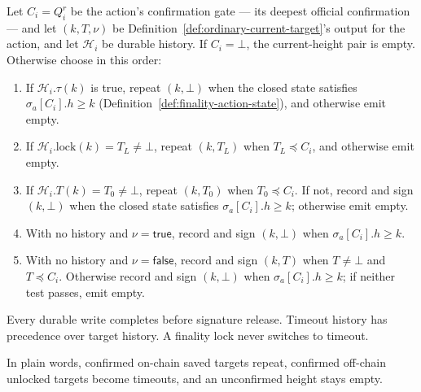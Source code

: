\begin{definition}\label{def:height-vote-rule}
Let \(C_i=Q_i^r\) be the action's confirmation gate --- its deepest
official confirmation --- and let
\((k,T,\nu)\) be Definition~\ref{def:ordinary-current-target}'s output for the
action, and let \(\mathcal H_i\) be durable history.  If
\(C_i=\bot\), the current-height pair is empty.  Otherwise choose in this
order:
\begin{enumerate}
 \item If \(\mathcal H_i.\tau(k)\) is true, repeat \((k,\bot)\) when the
   closed state satisfies \(\sigma_a[C_i].h\geq k\)
   (Definition~\ref{def:finality-action-state}), and otherwise emit empty.
 \item If \(\mathcal H_i.\mathrm{lock}(k)=T_L\neq\bot\), repeat
   \((k,T_L)\) when \(T_L\preceq C_i\), and otherwise emit empty.
 \item If \(\mathcal H_i.T(k)=T_0\neq\bot\), repeat \((k,T_0)\) when
   \(T_0\preceq C_i\).  If not, record and sign \((k,\bot)\) when the
   closed state satisfies \(\sigma_a[C_i].h\geq k\); otherwise emit empty.
 \item With no history and \(\nu=\mathsf{true}\), record and sign
   \((k,\bot)\) when \(\sigma_a[C_i].h\geq k\).
 \item With no history and \(\nu=\mathsf{false}\), record and sign \((k,T)\) when
   \(T\neq\bot\) and \(T\preceq C_i\).  Otherwise record and sign
   \((k,\bot)\) when \(\sigma_a[C_i].h\geq k\); if neither test
   passes, emit empty.
\end{enumerate}
Every durable write completes before signature release.  Timeout history has
precedence over target history.  A finality lock never switches to timeout.

In plain words, confirmed on-chain saved targets repeat, confirmed off-chain
unlocked targets become timeouts, and an unconfirmed height stays empty.
\end{definition}


